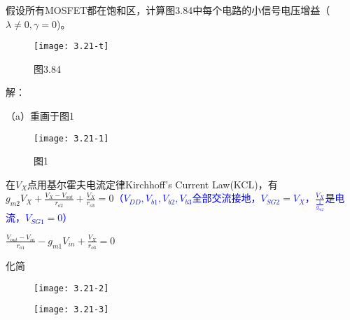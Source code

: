 







假设所有MOSFET都在饱和区，计算图3.84中每个电路的小信号电压增益（$\lambda  \neq 0, \gamma =0$)。

		\begin{figure}[H] %
	\begin{minipage}{\linewidth}
		\texttt{[image: 3.21-t]}
	\end{minipage}
	\caption*{图3.84} %
\end{figure}

解：

\scalebox{3}{（a）}

（a）重画于图1

		\begin{figure}[H] %
	\begin{minipage}{\linewidth}
		\texttt{[image: 3.21-1]}
	\end{minipage}
	\caption*{图1} %
\end{figure}

在$V_X$点用基尔霍夫电流定律Kirchhoff’s Current Law(KCL)，有$g_{m2}V_X+\frac{V_X-V_{out}}{r_{o2}}+\frac{V_X}{r_{o3}}=0$\textcolor{blue}{（$V_{DD},V_{b1},V_{b2},V_{b3}$全部交流接地，$V_{SG2}=V_X$，$\frac{V_X}{\frac{1}{g_{m2}}}$是电流，$V_{SG1}=0$）}

$\frac{V_{out}-V_{in}}{r_{o1}}-g_{m1}V_{in}+\frac{V_X}{r_{o3}}=0$

化简

		\begin{figure}[H] %
	\begin{minipage}{\linewidth}
		\texttt{[image: 3.21-2]}
	\end{minipage}
\end{figure}

		\begin{figure}[H] %
	\begin{minipage}{\linewidth}
		\texttt{[image: 3.21-3]}
	\end{minipage}
\end{figure}

